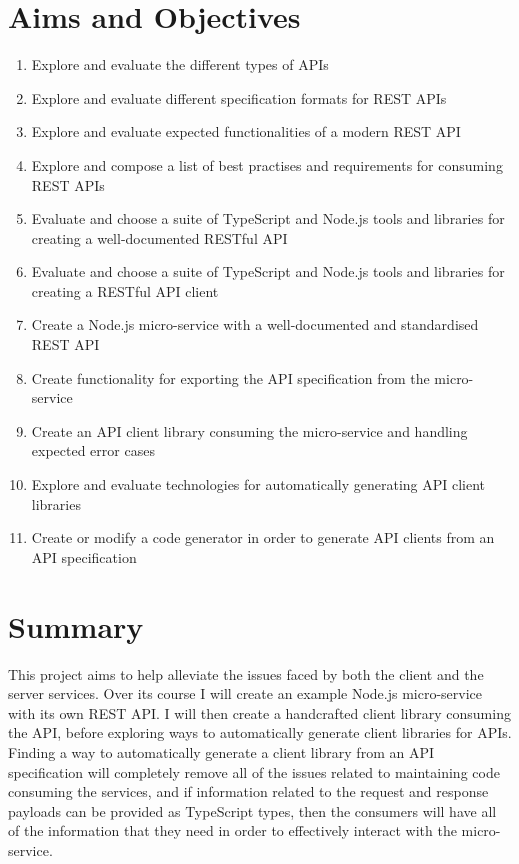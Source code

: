 \section{Aims and Objectives}
 \begin{enumerate}
   \item Explore and evaluate the different types of APIs
   \item Explore and evaluate different specification formats for REST APIs
   \item Explore and evaluate expected functionalities of a modern REST API
   \item Explore and compose a list of best practises and requirements for consuming REST APIs
   \item Evaluate and choose a suite of TypeScript and Node.js tools and libraries for creating a well-documented RESTful API
   \item Evaluate and choose a suite of TypeScript and Node.js tools and libraries for creating a RESTful API client
   \item Create a Node.js micro-service with a well-documented and standardised REST API
   \item Create functionality for exporting the API specification from the micro-service
   \item Create an API client library consuming the micro-service and handling expected error cases
   \item Explore and evaluate technologies for automatically generating API client libraries
   \item Create or modify a code generator in order to generate API clients from an API specification
 \end{enumerate}
 
 \section{Summary}
 
 This project aims to help alleviate the issues faced by both the client and the server services. Over its course I will create an example Node.js micro-service with its own REST API. I will then create a handcrafted client library consuming the API, before exploring ways to automatically generate client libraries for APIs. Finding a way to automatically generate a client library from an API specification will completely remove all of the issues related to maintaining code consuming the services, and if information related to the request and response payloads can be provided as TypeScript types, then the consumers will have all of the information that they need in order to effectively interact with the micro-service.